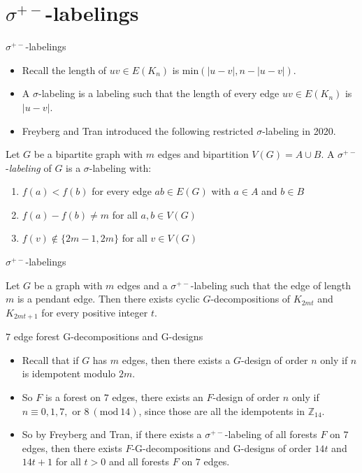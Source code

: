 \documentclass[xcolor=x11names,compress,8pt]{beamer}
\theoremstyle{plain}
\newcommand{\ZZ}{\ensuremath{\mathbb{Z}}}
\newcommand{\Mod}[1]{\ (\mathrm{mod}\ #1)}
\begin{document}
\section{$\sigma^{+-}$-labelings}
    \begin{frame}{$\sigma^{+-}$-labelings}
        \begin{itemize}
            \item Recall the length of  $uv \in E(K_n)$ is min$(|u-v|,n-|u-v|).$
            \pause
            \item A $\sigma$-labeling is a labeling such that the length of every edge $uv \in E(K_n)$ is $|u-v|.$
            \pause
            \item Freyberg and Tran introduced the following restricted $\sigma$-labeling in 2020.
        \end{itemize}
        \begin{definition}
         Let $G$ be a bipartite graph with $m$ edges and bipartition $V(G)=A\cup B$. A $\sigma^{+-}$-\emph{labeling} of $G$ is a $\sigma$-labeling with:
        \begin{enumerate}
            \item $f(a)<f(b)$ for every edge $ab\in E(G)$ with $a\in A$ and $b \in B$
            \item $f(a)-f(b) \neq m$ for all $a,b \in V(G)$
            \item $f(v) \not \in \{2m-1,2m\}$ for all $v \in V(G)$
        \end{enumerate}   
        \end{definition}    
        
        \end{frame}
        \begin{frame}{$\sigma^{+-}$-labelings}
            \begin{theorem}  
        Let $G$ be a graph with $m$ edges and a $\sigma^{+-}$-labeling such that the edge of length $m$ is a pendant edge. Then there exists cyclic $G$-decompositions of $K_{2mt}$ and $K_{2mt+1}$ for every positive integer $t.$
        \end{theorem}
        
        \end{frame}

    \begin{frame}{$7$ edge forest G-decompositions and G-designs}
        \begin{itemize}
            \item Recall that if $G$ has $m$ edges, then there exists a $G$-design of order $n$ only if $n$ is idempotent modulo $2m$.
            \item So $F$ is a forest on $7$ edges, there exists an $F$-design of order $n$ only if $n\equiv 0,1,7,\text{ or }8\Mod{14}$, since those are all the idempotents in $\ZZ_{14}$.
            \item So by Freyberg and Tran, if there exists a $\sigma^{+-}$-labeling of all forests $F$ on $7$ edges, then there exists $F$-G-decompositions and G-designs of order $14t$ and $14t+1$ for all $t>0$ and all forests $F$ on $7$ edges.
        \end{itemize}
    \end{frame}
\end{document}
